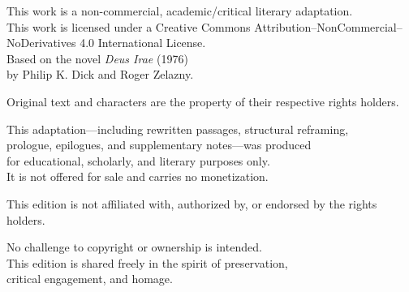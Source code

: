 \thispagestyle{empty}
\null
\vfill

\noindent This work is a non-commercial, academic/critical literary adaptation.\\
\noindent This work is licensed under a Creative Commons Attribution--NonCommercial--NoDerivatives 4.0 International License.\\

\noindent Based on the novel \emph{Deus Irae} (1976)\\
\noindent by Philip K. Dick and Roger Zelazny.\\

\medskip

\noindent \textcopyright{} Original text and characters are the property of their respective rights holders.\\

\medskip

\noindent This adaptation---including rewritten passages, structural reframing,\\
\noindent prologue, epilogues, and supplementary notes---was produced\\
\noindent for educational, scholarly, and literary purposes only.\\
\noindent It is not offered for sale and carries no monetization.\\

\medskip

\noindent This edition is not affiliated with, authorized by, or endorsed by the rights holders.\\

\medskip

\noindent No challenge to copyright or ownership is intended.\\
\noindent This edition is shared freely in the spirit of preservation,\\
\noindent critical engagement, and homage.

\vfill
\clearpage
